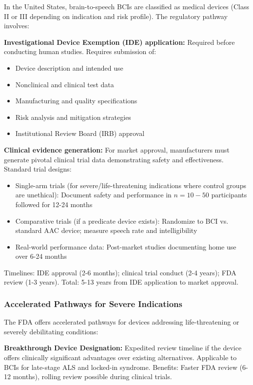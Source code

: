 In the United States, brain-to-speech BCIs are classified as medical devices (Class II or III depending on indication and risk profile). The regulatory pathway involves:

\textbf{Investigational Device Exemption (IDE) application:} Required before conducting human studies. Requires submission of:
\begin{itemize}
    \item Device description and intended use
    \item Nonclinical and clinical test data
    \item Manufacturing and quality specifications
    \item Risk analysis and mitigation strategies
    \item Institutional Review Board (IRB) approval
\end{itemize}

\textbf{Clinical evidence generation:} For market approval, manufacturers must generate pivotal clinical trial data demonstrating safety and effectiveness. Standard trial designs:
\begin{itemize}
    \item Single-arm trials (for severe/life-threatening indications where control groups are unethical): Document safety and performance in $n=10-50$ participants followed for 12-24 months
    \item Comparative trials (if a predicate device exists): Randomize to BCI vs. standard AAC device; measure speech rate and intelligibility
    \item Real-world performance data: Post-market studies documenting home use over 6-24 months
\end{itemize}

Timelines: IDE approval (2-6 months); clinical trial conduct (2-4 years); FDA review (1-3 years). Total: 5-13 years from IDE application to market approval.

\subsubsection{Accelerated Pathways for Severe Indications}

The FDA offers accelerated pathways for devices addressing life-threatening or severely debilitating conditions:

\textbf{Breakthrough Device Designation:} Expedited review timeline if the device offers clinically significant advantages over existing alternatives. Applicable to BCIs for late-stage ALS and locked-in syndrome. Benefits: Faster FDA review (6-12 months), rolling review possible during clinical trials.

